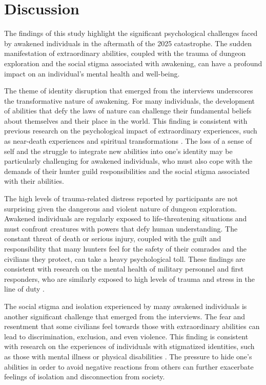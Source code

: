 \documentclass[12pt, a4paper]{article}
\begin{document}
\section{Discussion}
The findings of this study highlight the significant psychological challenges faced by awakened individuals in the aftermath of the 2025 catastrophe. The sudden manifestation of extraordinary abilities, coupled with the trauma of dungeon exploration and the social stigma associated with awakening, can have a profound impact on an individual's mental health and well-being.

The theme of identity disruption that emerged from the interviews underscores the transformative nature of awakening. For many individuals, the development of abilities that defy the laws of nature can challenge their fundamental beliefs about themselves and their place in the world. This finding is consistent with previous research on the psychological impact of extraordinary experiences, such as near-death experiences and spiritual transformations \citep{Greyson1997, Pargament2006}. The loss of a sense of self and the struggle to integrate new abilities into one's identity may be particularly challenging for awakened individuals, who must also cope with the demands of their hunter guild responsibilities and the social stigma associated with their abilities.

The high levels of trauma-related distress reported by participants are not surprising given the dangerous and violent nature of dungeon exploration. Awakened individuals are regularly exposed to life-threatening situations and must confront creatures with powers that defy human understanding. The constant threat of death or serious injury, coupled with the guilt and responsibility that many hunters feel for the safety of their comrades and the civilians they protect, can take a heavy psychological toll. These findings are consistent with research on the mental health of military personnel and first responders, who are similarly exposed to high levels of trauma and stress in the line of duty \citep{Smith2014, Berger2012}.

The social stigma and isolation experienced by many awakened individuals is another significant challenge that emerged from the interviews. The fear and resentment that some civilians feel towards those with extraordinary abilities can lead to discrimination, exclusion, and even violence. This finding is consistent with research on the experiences of individuals with stigmatized identities, such as those with mental illness or physical disabilities \citep{Corrigan2004, Susman2000}. The pressure to hide one's abilities in order to avoid negative reactions from others can further exacerbate feelings of isolation and disconnection from society.
\end{document}
